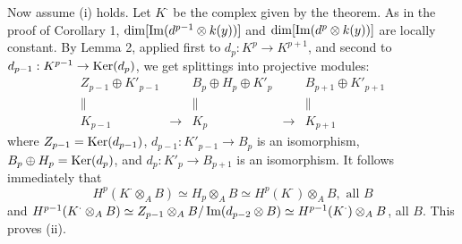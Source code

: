 Now assume (i) holds. Let $K^{\cdot}$ be the complex given by the theorem.
As in the proof of Corollary 1, $\dim[\operatorname{Im}(d^{p-1} \otimes k(y))]$
and $\dim[\operatorname{Im}(d^p \otimes k(y))]$ are locally constant. By Lemma 2, applied
first to $d_p : K^p \to K^{p+1}$, and second to
$d_{p-1} : K^{p-1} \to \operatorname{Ker}(d_p)$, we get splittings into projective modules:
\[
  \begin{array}{ccccc}
    Z_{p-1} \oplus K'_{p-1} & & B_p \oplus H_p \oplus K'_p & & B_{p+1} \oplus K'_{p+1} \\
    \| & & \| & & \| \\
    K_{p-1} & \longrightarrow & K_p & \longrightarrow & K_{p+1}
  \end{array}
\]
where $Z_{p-1} = \operatorname{Ker}(d_{p-1})$, $d_{p-1} : K'_{p-1} \to B_p$ is an
isomorphism, $B_p \oplus H_p = \operatorname{Ker}(d_p)$, and $d_p : K'_p \to B_{p+1}$ is an
isomorphism. It follows immediately that
\[
  H^p(K^{\cdot} \otimes_A B) \simeq H_p \otimes_A B \simeq
  H^p(K^{\cdot}) \otimes_A B, \text{ all } B
\]
and
$H^{p-1}(K^{\cdot} \otimes_A B) \simeq
 Z_{p-1} \otimes_A B / \operatorname{Im}(d_{p-2} \otimes B) \simeq
 H^{p-1}(K^{\cdot}) \otimes_A B$,
all $B$. This proves (ii).
